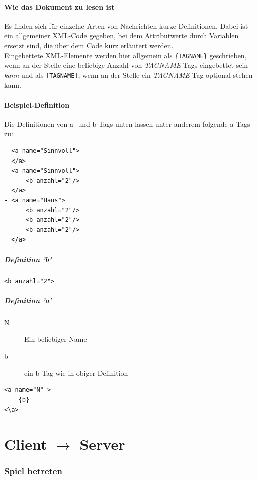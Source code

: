 \documentclass[12pt,a4paper, ngerman, oneside]{scrartcl}
\begin{document}
\subsection*{Wie das Dokument zu lesen ist}

Es finden sich für einzelne Arten von Nachrichten kurze Definitionen. Dabei ist
ein allgemeiner XML-Code gegeben, bei dem Attributwerte durch Variablen ersetzt
sind, die über dem Code kurz erläutert werden.\\ Eingebettete XML-Elemente
werden hier allgemein als \verb|{TAGNAME}| geschrieben, wenn an der Stelle eine
beliebige Anzahl von \textit{TAGNAME}-Tags eingebettet sein \emph{kann} und
als \verb|[TAGNAME]|, wenn an der Stelle ein \textit{TAGNAME}-Tag optional stehen kann.

\subsection{Beispiel-Definition}

Die Definitionen von a- und b-Tags unten lassen unter anderem folgende a-Tags
zu:
\begin{verbatim}
- <a name="Sinnvoll">
  </a>
- <a name="Sinnvoll">
      <b anzahl="2"/>
  </a>
- <a name="Hans">
      <b anzahl="2"/>
      <b anzahl="2"/>
      <b anzahl="2"/>
  </a>
\end{verbatim}
\subsubsection*{Definition 'b'}
\begin{verbatim}
<b anzahl="2">
\end{verbatim}
\subsubsection*{Definition 'a'}
\begin{description}
\item[N] Ein beliebiger Name
\item[b] ein b-Tag wie in obiger Definition
\end{description}
\begin{verbatim}
<a name="N" >
	{b}
<\a>
\end{verbatim}

\newpage
\part{Client $\rightarrow$ Server}
\section{Spiel betreten}
\end{document}
